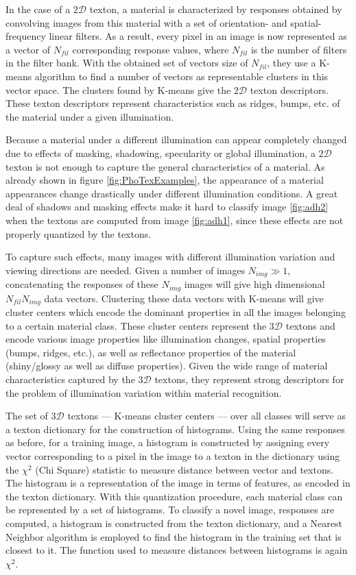 In the case of a $2\mathcal{D}$ texton, a material is characterized by responses obtained by convolving images from this material with a set of orientation- and spatial-frequency linear filters. As a result, every pixel in an image is now represented as a vector of $N_{fil}$ corresponding response values, where $N_{fil}$ is the number of filters in the filter bank. With the obtained set of vectors size of $N_{fil}$, they use a K-means algorithm  to find a number of vectors as representable clusters in this vector space. The clusters found by K-means give the $2\mathcal{D}$ texton descriptors. These texton descriptors represent characteristics such as ridges, bumps, etc. of the material under a given illumination.

Because a material under a different illumination can appear completely changed due to effects of masking, shadowing, specularity or global illumination, a $2\mathcal{D}$ texton is not enough to capture the general characteristics of a material. As already shown in figure \ref{fig:PhoTexExamples}, the appearance of a material appearances change drastically under different illumination conditions. A great deal of shadows and masking effects make it hard to classify image \ref{fig:adh2} when the textons are computed from image \ref{fig:adh1}, since these effects are not properly quantized by the textons. 

To capture such effects, many images with different illumination variation and viewing directions are needed. Given a number of images $N_{img} \gg 1$,  concatenating the responses of these $N_{img}$ images will give high dimensional $N_{fil}N_{img}$ data vectors. Clustering these data vectors with K-means will give cluster centers which encode the dominant properties in all the images belonging to a certain material class. These cluster centers represent the $3\mathcal{D}$ textons and encode various image properties like illumination changes, spatial properties (bumps, ridges, etc.), as well as reflectance properties of the material (shiny/glossy as well as diffuse properties). Given the wide range of material characteristics captured by the $3\mathcal{D}$ textons, they represent strong descriptors for the problem of illumination variation within material recognition.

The set of $3\mathcal{D}$ textons --- K-means cluster centers --- over all classes will serve as a texton dictionary for the construction of histograms. Using the same responses as before, for a training image, a histogram is constructed by assigning every vector corresponding to a pixel in the image to a texton in the dictionary using the $\chi^2$ (Chi Square) statistic to measure distance between vector and textons. The histogram is a representation of the image in terms of features, as encoded in the texton dictionary. With this quantization procedure, each material class can be represented by a set of histograms. To classify a novel image, responses are computed, a histogram is constructed from the texton dictionary, and a Nearest Neighbor algorithm  is employed to find the histogram in the training set that is closest to it. The function used to measure distances between histograms is again $\chi^2$.

